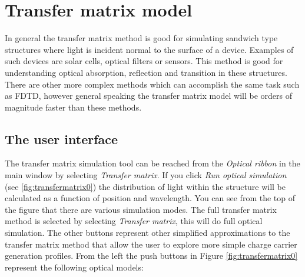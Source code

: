 \section{Transfer matrix model}
In general the transfer matrix method is good for simulating sandwich type structures where light is incident normal to the surface of a device. Examples of such devices are solar cells, optical filters or sensors. This method is good for understanding optical absorption, reflection and transition in these structures.  There are other more complex methods which can accomplish the same task such as FDTD, however general speaking the transfer matrix model will be orders of magnitude faster than these methods.

\subsection{The user interface}
The transfer matrix simulation tool can be reached from the \emph{Optical ribbon} in the main window by selecting \emph{Transfer matrix}.  If you click \emph{Run optical simulation} (see \ref{fig:transfermatrix0}) the distribution of light within the structure will be calculated as a function of position and wavelength. You can see from the top of the figure that there are various simulation modes. The full transfer matrix method is selected by selecting \emph{Transfer matrix}, this will do full optical simulation.  The other buttons represent other simplified approximations to the transfer matrix method that allow the user to explore more simple charge carrier generation profiles. From the left the push buttons in Figure \ref{fig:transfermatrix0} represent the following optical models:

